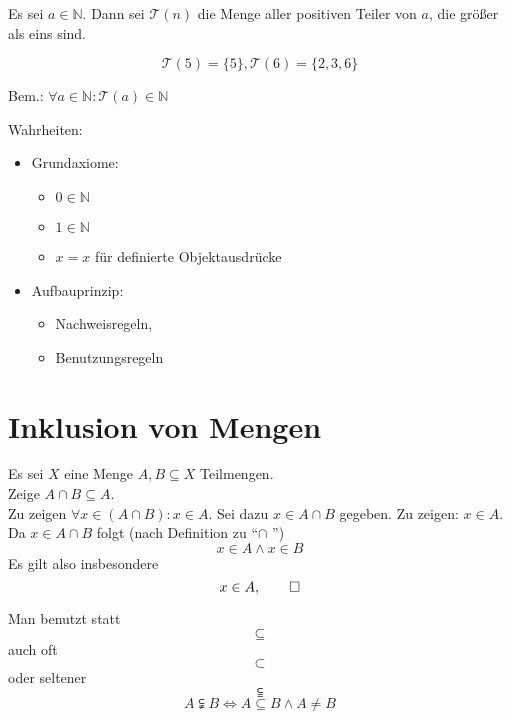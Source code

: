 \documentclass[a4paper, parskip = true, fleqn, headsepline = true]{scrartcl}
\DeclareRobustCommand{\qed}{%
	\ifmmode \tag*{$\Box$}%
	\else \leavevmode\unskip\penalty9999 \hbox{}\nobreak\hfill\quad\hbox{$\Box$}%
	\fi%
}
\newcommand{\N}{\mathbb{N}}
\begin{document}
\begin{definition}[Teilermenge]
	\label{def:Teilermenge}
	Es sei $ a \in \mathbb{N} $. Dann sei $ \mathcal{T}(n) $ die Menge aller positiven Teiler von $ a $, die größer als eins sind.
	\begin{example}
		\[ \mathcal{T}(5) = \{5\}, \mathcal{T}(6) = \{2, 3, 6\} \]
	\end{example}
	Bem.: $ \forall a \in \mathbb{N} : \mathcal{T}(a) \in \mathbb{N} $
\end{definition}

Wahrheiten:
\begin{itemize}
	\item Grundaxiome:
		\begin{itemize}
			\item $ 0 \in \N $
			\item $ 1 \in \N $
			\item $ x = x $ für definierte Objektausdrücke
		\end{itemize}
	\item Aufbauprinzip:
		\begin{itemize}
			\item Nachweisregeln,
			\item Benutzungsregeln
		\end{itemize}
\end{itemize}



\section{Inklusion von Mengen}

\begin{example}
	Es sei $ X $ eine Menge $ A, B \subseteq X $ Teilmengen.\\
	Zeige $ A \cap B \subseteq A $.\\
	Zu zeigen $ \forall x \in ( A \cap B ) : x \in A $. Sei dazu $ x \in A \cap B $ gegeben. Zu zeigen: $ x \in A $. Da $ x \in A \cap B $ folgt (nach Definition zu ``$ \cap $ '')
	\[ x \in A \wedge x \in B \]
	Es gilt also insbesondere
	\[ x \in A, \qed \]
\end{example}

\begin{important}
	Man benutzt statt
	\[ \subseteq \]
	auch oft
	\[ \subset \]
	oder seltener
	\[ \subseteqq \]
	\[ A \subsetneqq B \iff A \subseteq B \wedge A \neq B \]
\end{important}
\end{document}
